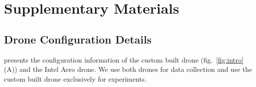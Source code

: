 
%
%

% 

\sectionfont{\MakeUppercase}
\section*{Supplementary Materials}


\setcounter{table}{0}
\renewcommand{\thetable}{S\arabic{table}}

\setcounter{subsection}{0}
\renewcommand{\thesubsection}{Section S\arabic{subsection}}

\setcounter{figure}{0}
\renewcommand{\thefigure}{S\arabic{figure}}

\subsection{Drone Configuration Details}
\label{sec:supp-drone-configuration}

 presents the configuration information of the custom built drone (fig.~\ref{fig:intro}(A)) and the Intel Aero drone. We use both drones for data collection and use the custom built drone exclusively for experiments.

